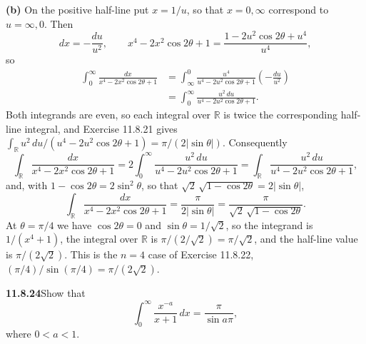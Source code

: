 \textbf{(b)} On the positive half-line put $x=1/u$, so that
$x=0,\infty$ correspond to $u=\infty,0$. Then
\[
dx=-\frac{du}{u^2},\qquad
x^4-2x^2\cos2\theta+1
=\frac{1-2u^2\cos2\theta+u^4}{u^4},
\]
so
\[
\begin{aligned}
\int_0^\infty\frac{dx}{x^4-2x^2\cos2\theta+1}
&=\int_\infty^0\frac{u^4}{u^4-2u^2\cos2\theta+1}
\left(-\frac{du}{u^2}\right)\\
&=\int_0^\infty\frac{u^2\,du}{u^4-2u^2\cos2\theta+1}.
\end{aligned}
\]
Both integrands are even, so each integral over $\mathbb R$ is twice
the corresponding half-line integral, and Exercise 11.8.21 gives
$\int_{\mathbb R}u^2\,du/(u^4-2u^2\cos2\theta+1)=\pi/(2|\sin\theta|)$.
Consequently
\[
\int_{\mathbb R}\frac{dx}{x^4-2x^2\cos2\theta+1}
=2\int_0^\infty\frac{u^2\,du}{u^4-2u^2\cos2\theta+1}
=\int_{\mathbb R}\frac{u^2\,du}{u^4-2u^2\cos2\theta+1},
\]
and, with $1-\cos2\theta=2\sin^2\theta$, so that
$\sqrt2\,\sqrt{1-\cos2\theta}=2|\sin\theta|$,
\[
\boxed{\int_{\mathbb R}\frac{dx}{x^4-2x^2\cos2\theta+1}
=\frac{\pi}{2|\sin\theta|}
=\frac{\pi}{\sqrt2\,\sqrt{1-\cos2\theta}}}.
\]
At $\theta=\pi/4$ we have $\cos2\theta=0$ and $\sin\theta=1/\sqrt2$,
so the integrand is $1/(x^4+1)$, the integral over $\mathbb R$ is
$\pi/(2/\sqrt2)=\pi/\sqrt2$, and the half-line value is
$\pi/(2\sqrt2)$. This is the $n=4$ case of Exercise 11.8.22,
$(\pi/4)/\sin(\pi/4)=\pi/(2\sqrt2)$.

\par\bigskip
\noindent\textbf{11.8.24}\quad Show that
\[
\int_{0}^{\infty}\frac{x^{-a}}{x+1}\,dx=\frac{\pi}{\sin a\pi},
\]
where $0 < a < 1$.

